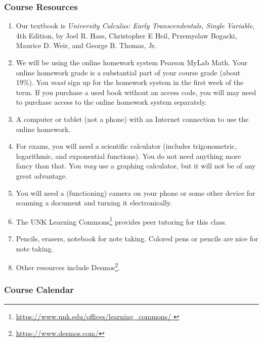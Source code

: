 \documentclass[12pt]{article}
\newcounter{ex}\setcounter{ex}{0}
\begin{document}
\subsubsection*{Course Resources}
\begin{enumerate}

    \item Our textbook is \emph{University Calculus: Early Transcendentals, Single Variable},  4th Edition, by Joel R. Hass, Christopher E Heil, Przemyslaw Bogacki,
    Maurice D. Weir,  and George B. Thomas, Jr.
    
    \item We will be using the online homework system Pearson MyLab Math. Your online homework grade is a 
    substantial part of your course grade (about 19\%). You \emph{must} sign up for the homework system in the first week of the term. If you purchase a used book without an access code, you will  may need to purchase access to the online homework system
    separately.
    
    \item A computer or tablet (not a phone) with an Internet connection to use the online homework.
    
    
    \item For exams, you will need a scientific calculator (includes trigonometric, logarithmic, 
    and exponential functions).  You do not need anything more fancy 
    than that. You \emph{may} use a graphing calculator, but it will not be of any great advantage.
    
    \item You will need a (functioning) camera on your phone or some 
    other device for scanning a document and turning it electronically. 
    
    \item The UNK Learning Commons\footnote{\url{https://www.unk.edu/offices/learning_commons/ }} provides peer tutoring for this class. 
        
    \item Pencils, erasers, notebook for note taking. Colored pens or pencils are nice for note taking.
    
     \item Other resources include Desmos\footnote{\url{https://www.desmos.com/}}.    
     \end{enumerate}



\subsubsection*{Course Calendar}
\end{document}
